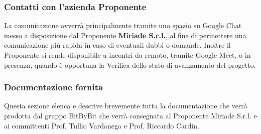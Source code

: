 \documentclass[a4paper,12pt]{article}
\begin{document}
\subsubsection{Contatti con l'azienda Proponente}
La comunicazione avverrà principalmente tramite uno spazio su Google Chat messo a disposizione dal Proponente \textbf{Miriade S.r.l.}, al fine di permettere una comunicazione più rapida in caso di eventuali dubbi o domande.
Inoltre il Proponente si rende disponibile a incontri da remoto, tramite Google Meet, o in presenza, quando è opportuna la Verifica dello stato di avanzamento del progetto.

\subsubsection{Documentazione fornita}
Questa sezione elenca e descrive brevemente tutta la documentazione che verrà prodotta dal gruppo BitByBit che verrà consegnata al Proponente Miriade S.r.l. e ai committenti Prof. Tullio Vardanega e Prof. Riccardo Cardin.
\end{document}
